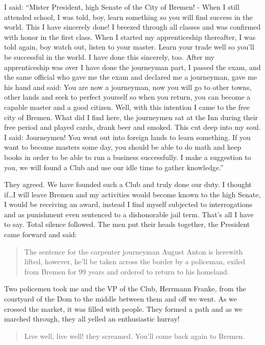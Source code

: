 \documentclass{article}
\begin{document}
I said: ``Mister President, high Senate of the City of Bremen! - When I still attended school, I was told, boy, learn something so you will find success in the world. This I have sincerely done! I breezed through all classes and was confirmed with honor in the first class. When I started my apprenticeship thereafter, I was told again, boy watch out, listen to your master. Learn your trade well so you'll be successful in the world. I have done this sincerely, too. After my apprenticeship was over I have done the journeyman part, I passed the exam, and the same official who gave me the exam and declared me a journeyman, gave me his hand and said: You are now a journeyman, now you will go to other towns, other lands and seek to perfect yourself so when you return, you can become a capable master and a good citizen. Well, with this intention I came to the free city of Bremen. What did I find here, the journeymen sat at the Inn during their free period and played cards, drank beer and smoked. This cut deep into my soul. I said: Journeymen! You went out into foreign lands to learn something. If you want to become masters some day, you should be able to do math and keep books in order to be able to run a business successfully. I make a suggestion to you, we will found a Club and use our idle time to gather knowledge.''

They agreed. We have founded such a Club and truly done our duty. I thought if\ldots I will leave Bremen and my activities would become known to the high Senate, I would be receiving an award, instead I find myself subjected to interrogations and as punishment even sentenced to a dishonorable jail term. That's all I have to say. Total silence followed. The men put their heads together, the President came forward and said:

\begin{quote}
The sentence for the carpenter journeyman August Anton is herewith lifted, however, he'll be taken across the border by a policeman, exiled from Bremen for 99 years and ordered to return to his homeland.
\end{quote}

Two policemen took me and the VP of the Club, Herrmann Franke, from the courtyard of the Dom to the middle between them and off we went. As we crossed the market, it was filled with people. They formed a path and as we marched through, they all yelled an enthusiastic hurray!

\begin{quote}
Live well, live well! they screamed. You'll come back again to Bremen.
\end{quote}
\end{document}
